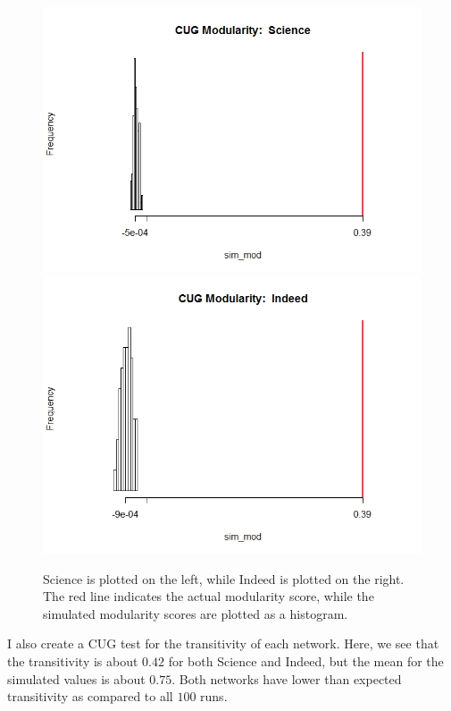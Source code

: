 \documentclass[12pt]{article}
\begin{document}
\begin{figure}[H]
	\centering
	\includegraphics[scale=0.3]{Images/cug_mod_sci.jpeg}
	\includegraphics[scale=0.3]{Images/cug_mod_ind.jpeg}
	\caption{Science is plotted on the left, while Indeed is plotted on the right. The red line indicates the actual modularity score, while the simulated modularity scores are plotted as a histogram.}
\end{figure}
\vspace{2mm} 

\noindent I also create a CUG test for the transitivity of each network. Here, we see that the transitivity is about $0.42$ for both Science and Indeed, but the mean for the simulated values is about $0.75$. Both networks have lower than expected transitivity as compared to all $100$ runs.
\end{document}
